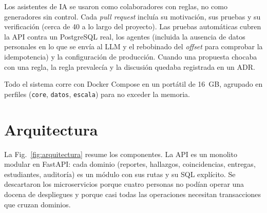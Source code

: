 \documentclass[conference]{IEEEtran}
\begin{document}
Los asistentes de IA se usaron como colaboradores con reglas, no como generadores sin control. Cada \emph{pull request} incluía su motivación, sus pruebas y su verificación (cerca de 40 a lo largo del proyecto). Las pruebas automáticas cubren la API contra un PostgreSQL real, los agentes (incluida la ausencia de datos personales en lo que se envía al LLM y el rebobinado del \emph{offset} para comprobar la idempotencia) y la configuración de producción. Cuando una propuesta chocaba con una regla, la regla prevalecía y la discusión quedaba registrada en un ADR.

Todo el sistema corre con Docker Compose en un portátil de 16~GB, agrupado en perfiles (\texttt{core}, \texttt{datos}, \texttt{escala}) para no exceder la memoria.

\section{Arquitectura}

La Fig.~\ref{fig:arquitectura} resume los componentes. La API es un monolito modular en FastAPI: cada dominio (reportes, hallazgos, coincidencias, entregas, estudiantes, auditoría) es un módulo con sus rutas y su SQL explícito. Se descartaron los microservicios porque cuatro personas no podían operar una docena de despliegues y porque casi todas las operaciones necesitan transacciones que cruzan dominios.
\end{document}
